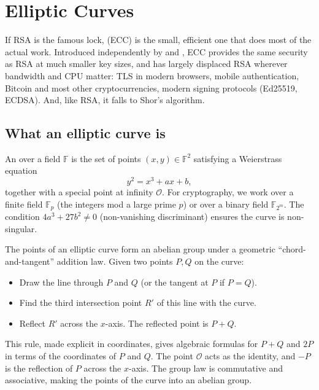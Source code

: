 \chapter{Elliptic Curves}


If RSA is the famous lock,  (ECC) is the small, efficient one that does most of the actual work. Introduced independently by \citet{koblitz_elliptic_1987} and \citet{miller_use_1986}, ECC provides the same security as RSA at much smaller key sizes, and has largely displaced RSA wherever bandwidth and CPU matter: TLS in modern browsers, mobile authentication, Bitcoin and most other cryptocurrencies, modern signing protocols (Ed25519, ECDSA). And, like RSA, it falls to Shor's algorithm.

\section{What an elliptic curve is}

An  over a field $\mathbb{F}$ is the set of points $(x,y) \in \mathbb{F}^2$ satisfying a Weierstrass equation
\[
  y^2 = x^3 + ax + b,
\]
together with a special point at infinity $\mathcal{O}$. For cryptography, we work over a finite field $\mathbb{F}_p$ (the integers mod a large prime $p$) or over a binary field $\mathbb{F}_{2^m}$. The condition $4a^3 + 27b^2 \neq 0$ (non-vanishing discriminant) ensures the curve is non-singular.

The points of an elliptic curve form an abelian group under a geometric ``chord-and-tangent'' addition law. Given two points $P, Q$ on the curve:

\begin{itemize}
  \item Draw the line through $P$ and $Q$ (or the tangent at $P$ if $P = Q$).
  \item Find the third intersection point $R'$ of this line with the curve.
  \item Reflect $R'$ across the $x$-axis. The reflected point is $P + Q$.
\end{itemize}

This rule, made explicit in coordinates, gives algebraic formulas for $P+Q$ and $2P$ in terms of the coordinates of $P$ and $Q$. The point $\mathcal{O}$ acts as the identity, and $-P$ is the reflection of $P$ across the $x$-axis. The group law is commutative and associative, making the points of the curve into an abelian group.

